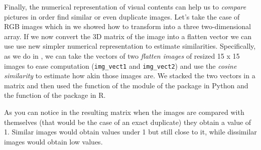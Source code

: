 
Finally, the numerical representation of visual contents can help us to \textit{compare} pictures in order find similar or even duplicate images. Let's take the case of RGB images which in  we showed how to transform into a three two-dimensional array. If we now convert the 3D matrix of the image into a flatten vector we can use use new simpler numerical representation to estimate similarities. Specifically, as we do in , we can take the vectors of two \textit{flatten images} of resized 15 x 15 images to ease computation (\texttt{img\_vect1} and \texttt{img\_vect2}) and use the \textit{cosine similarity} to estimate how akin those images are. We stacked the two vectors in a matrix and then used the  function of the  module of the   package in Python and the  function of the  package in R.

 
As you can notice in the resulting matrix when the images are compared with themselves (that would be the case of an exact duplicate) they obtain a value of 1. Similar images would obtain values under 1 but still close to it, while dissimilar images would obtain low values.
